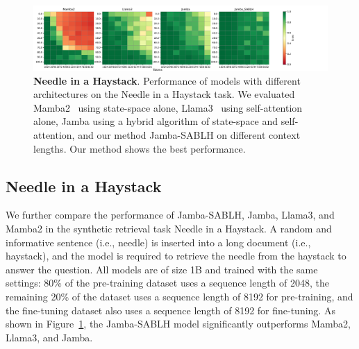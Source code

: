 \documentclass{article}
\theoremstyle{plain}
\theoremstyle{definition}
\theoremstyle{remark}
\begin{document}
\begin{figure}[ht]
   \centering
   \includegraphics[width=\linewidth]{fig/needle-in-a-haystack.pdf}
   \caption{
     \textbf{Needle in a Haystack}.
      Performance of models with different architectures on the Needle in a Haystack task. We evaluated Mamba2~\cite{mamba2} using state-space alone, Llama3~\cite{grattafiori2024llama3herdmodels} using self-attention alone, Jamba using a hybrid algorithm of state-space and self-attention, and our method Jamba-SABLH on different context lengths. Our method shows the best performance.
      }
   \label{fig:niah}
\end{figure}

\subsection{Needle in a Haystack}

We further compare the performance of Jamba-SABLH, Jamba, Llama3, and Mamba2 in the synthetic retrieval task Needle in a Haystack. A random and informative sentence (i.e., needle) is inserted into a long document (i.e., haystack), and the model is required to retrieve the needle from the haystack to answer the question. All models are of size 1B and trained with the same settings: 80\% of the pre-training dataset uses a sequence length of 2048, the remaining 20\% of the dataset uses a sequence length of 8192 for pre-training, and the fine-tuning dataset also uses a sequence length of 8192 for fine-tuning. As shown in Figure~\ref{fig:niah}, the Jamba-SABLH model significantly outperforms Mamba2, Llama3, and Jamba.
\end{document}
